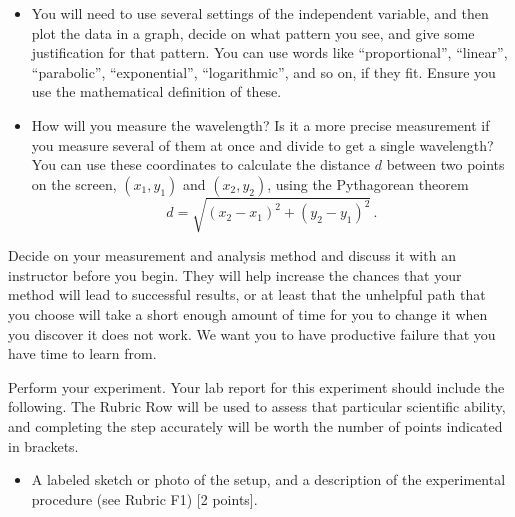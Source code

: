 \begin{steps}
\begin{itemize}
		\item You will need to use several settings of the independent variable, and then plot the data in a graph, decide on what pattern you see, and give some justification for that pattern. You can use words like ``proportional'', ``linear'', ``parabolic'', ``exponential'', ``logarithmic'', and so on, if they fit. Ensure you use the mathematical definition of these.
		
		\item How will you measure the wavelength? Is it a more precise measurement if you measure several of them at once and divide to get a single wavelength? You can use these coordinates to calculate the distance $d$ between two points on the screen, $(x_1, y_1)$ and $(x_2, y_2)$, using the Pythagorean theorem
		\begin{equation}
		d = \sqrt{(x_2-x_1)^2+(y_2-y_1)^2} \,.
		\end{equation}
			
		
	\end{itemize}

	\item Decide on your measurement and analysis method and discuss it with an instructor before you begin. They will help increase the chances that your method will lead to successful results, or at least that the unhelpful path that you choose will take a short enough amount of time for you to change it when you discover it does not work. We want you to have productive failure that you have time to learn from.
	
	\item Perform your experiment. Your lab report for this experiment should include the following. The Rubric Row will be used to assess that particular scientific ability, and completing the step accurately will be worth the number of points indicated in brackets.
	\begin{itemize}
		\item A labeled sketch or photo of the setup, and a description of the experimental procedure (see Rubric F1) [2 points].
		

\end{itemize}
\end{steps}
